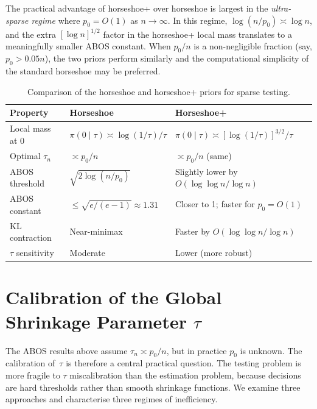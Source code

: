 \documentclass[12pt]{article}
\begin{document}
The practical advantage of horseshoe+ over horseshoe is largest in the \emph{ultra-sparse regime} where $p_0 = O(1)$ as $n \to \infty$. In this regime, $\log(n/p_0) \asymp \log n$, and the extra $[\log n]^{1/2}$ factor in the horseshoe+ local mass translates to a meaningfully smaller ABOS constant. When $p_0/n$ is a non-negligible fraction (say, $p_0 > 0.05n$), the two priors perform similarly and the computational simplicity of the standard horseshoe may be preferred.

\begin{table}[H]
\centering
\small
\renewcommand{\arraystretch}{1.3}
\begin{tabular}{@{}lll@{}}
\toprule
\textbf{Property} & \textbf{Horseshoe} & \textbf{Horseshoe+} \\
\midrule
Local mass at 0 & $\pi(0\mid\tau) \asymp \log(1/\tau)/\tau$ & $\pi(0\mid\tau) \asymp [\log(1/\tau)]^{3/2}/\tau$ \\
Optimal $\tau_n$ & $\asymp p_0/n$ & $\asymp p_0/n$ (same) \\
ABOS threshold & $\sqrt{2\log(n/p_0)}$ & Slightly lower by $O(\log\log n/\log n)$ \\
ABOS constant & $\leq \sqrt{e/(e-1)} \approx 1.31$ & Closer to 1; faster for $p_0 = O(1)$ \\
KL contraction & Near-minimax & Faster by $O(\log\log n/\log n)$ \\
$\tau$ sensitivity & Moderate & Lower (more robust) \\
\bottomrule
\end{tabular}
\caption{Comparison of the horseshoe and horseshoe+ priors for sparse testing.}
\label{tab:hs-comparison}
\end{table}


\section{Calibration of the Global Shrinkage Parameter $\tau$}\label{sec:tau}

The ABOS results above assume $\tau_n \asymp p_0/n$, but in practice $p_0$ is unknown. The calibration of~$\tau$ is therefore a central practical question. The testing problem is more fragile to $\tau$ miscalibration than the estimation problem, because decisions are hard thresholds rather than smooth shrinkage functions. We examine three approaches and characterise three regimes of inefficiency.
\end{document}
